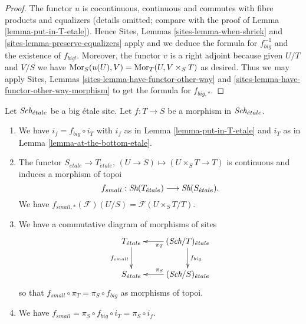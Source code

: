 \begin{proof}
The functor $u$ is cocontinuous, continuous and commutes with fibre products
and equalizers (details omitted; compare with the proof of
Lemma \ref{lemma-put-in-T-etale}).
Hence
Sites, Lemmas \ref{sites-lemma-when-shriek} and
\ref{sites-lemma-preserve-equalizers}
apply and we deduce the formula
for $f_{big}^{-1}$ and the existence of $f_{big!}$. Moreover,
the functor $v$ is a right adjoint because given $U/T$ and $V/S$
we have $\mathop{\rm Mor}\nolimits_S(u(U), V) = \mathop{\rm Mor}\nolimits_T(U, V \times_S T)$
as desired. Thus we may apply
Sites, Lemmas \ref{sites-lemma-have-functor-other-way} and
\ref{sites-lemma-have-functor-other-way-morphism} to get the
formula for $f_{big, *}$.
\end{proof}

\begin{lemma}
\label{lemma-morphism-big-small-etale}
Let $\textit{Sch}_{\acute{e}tale}$ be a big \'etale site.
Let $f : T \to S$ be a morphism in $\textit{Sch}_{\acute{e}tale}$.
\begin{enumerate}
\item We have $i_f = f_{big} \circ i_T$ with $i_f$ as in
Lemma \ref{lemma-put-in-T-etale} and $i_T$ as in
Lemma \ref{lemma-at-the-bottom-etale}.
\item The functor $S_{\acute{e}tale} \to T_{\acute{e}tale}$,
$(U \to S) \mapsto (U \times_S T \to T)$ is continuous and induces
a morphism of topoi
$$
f_{small} :
\mathop{\textit{Sh}}\nolimits(T_{\acute{e}tale})
\longrightarrow
\mathop{\textit{Sh}}\nolimits(S_{\acute{e}tale}).
$$
We have $f_{small, *}(\mathcal{F})(U/S) = \mathcal{F}(U \times_S T/T)$.
\item We have a commutative diagram of morphisms of sites
$$
\xymatrix{
T_{\acute{e}tale} \ar[d]_{f_{small}} &
(\Sch/T)_{\acute{e}tale} \ar[d]^{f_{big}} \ar[l]^{\pi_T}\\
S_{\acute{e}tale} &
(\Sch/S)_{\acute{e}tale} \ar[l]_{\pi_S}
}
$$
so that $f_{small} \circ \pi_T = \pi_S \circ f_{big}$ as morphisms of topoi.
\item We have $f_{small} = \pi_S \circ f_{big} \circ i_T = \pi_S \circ i_f$.
\end{enumerate}
\end{lemma}

